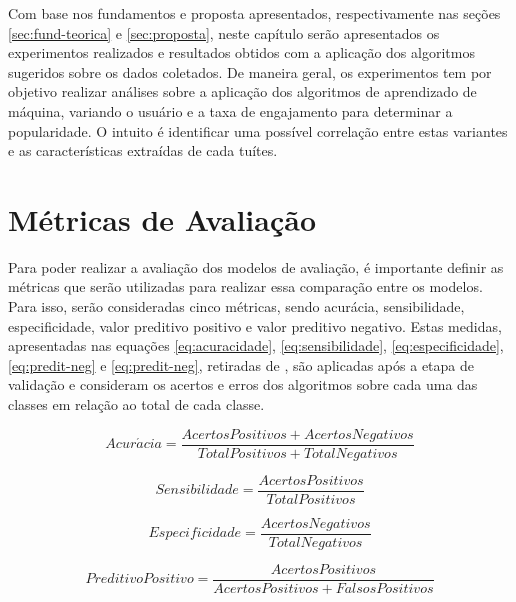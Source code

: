\documentclass[oneside,openright,12pt]{ufsm_2015} %
\begin{document}
    \par Com base nos fundamentos e proposta apresentados, respectivamente nas seções \ref{sec:fund-teorica} e \ref{sec:proposta}, neste capítulo serão apresentados os experimentos realizados e resultados obtidos com a aplicação dos algoritmos sugeridos sobre os dados coletados. De maneira geral, os experimentos tem por objetivo realizar análises sobre a aplicação dos algoritmos de aprendizado de máquina, variando o usuário e a taxa de engajamento para determinar a popularidade. O intuito é identificar uma possível correlação entre estas variantes e as características extraídas de cada tuítes.
    

\section{Métricas de Avaliação}
\label{sec:class-metricas}

    \par Para poder realizar a avaliação dos modelos de avaliação, é importante definir as métricas que serão utilizadas para realizar essa comparação entre os modelos. Para isso, serão consideradas cinco métricas, sendo acurácia, sensibilidade, especificidade, valor preditivo positivo e valor preditivo negativo. Estas medidas, apresentadas nas equações \ref{eq:acuracidade}, \ref{eq:sensibilidade}, \ref{eq:especificidade}, \ref{eq:predit-neg} e \ref{eq:predit-neg}, retiradas de \cite{book:han:11}, são aplicadas após a etapa de validação e consideram os acertos e erros dos algoritmos sobre cada uma das classes em relação ao total de cada classe.
    
    \begin{equation} \label{eq:acuracidade}
    Acur\acute{a}cia = \frac{AcertosPositivos + AcertosNegativos}{TotalPositivos + TotalNegativos}
    \end{equation}
    
    \begin{equation} \label{eq:sensibilidade}
    Sensibilidade = \frac{AcertosPositivos}{TotalPositivos}
    \end{equation}
    
    \begin{equation} \label{eq:especificidade}
    Especificidade = \frac{AcertosNegativos}{TotalNegativos}
    \end{equation}
    
    \begin{equation} \label{eq:predit-pos}
    PreditivoPositivo = \frac{AcertosPositivos}{AcertosPositivos + FalsosPositivos}
    \end{equation}
    
\end{document}

